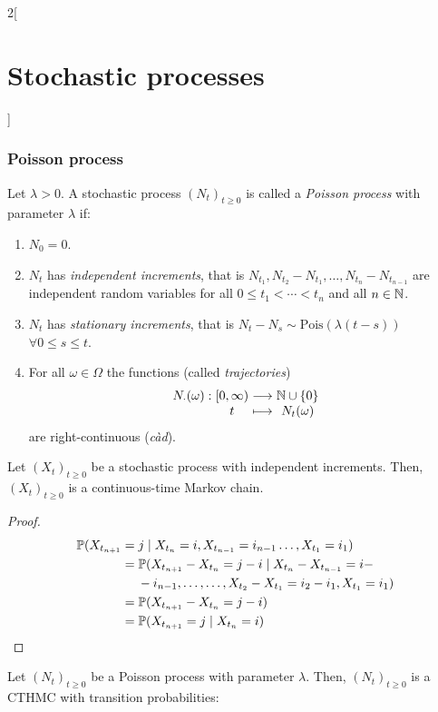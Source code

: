 \documentclass[../../../main_math.tex]{subfiles}
\begin{document}
\begin{multicols}{2}[\section{Stochastic processes}]
  \subsubsection{Poisson process}
  \begin{definition}
    Let $\lambda>0$. A stochastic process ${(N_t)}_{t\geq 0}$ is called a \emph{Poisson process} with parameter $\lambda$ if:
    \begin{enumerate}
      \item $N_0=0$.
      \item $N_t$ has \emph{independent increments}, that is $N_{t_1}, N_{t_2}-N_{t_1},\ldots,N_{t_n}-N_{t_{n-1}}$ are independent random variables for all $0\leq t_1<\cdots<t_n$ and all $n\in\mathbb{N}$.
      \item $N_t$ has \emph{stationary increments}, that is $N_t-N_s\sim\text{Pois}(\lambda(t-s))$ $\forall 0\leq s\leq t$.
      \item For all $\omega\in\Omega$ the functions (called \emph{trajectories})
            $$
              \function{N_\cdot(\omega)}{[0,\infty)}{\NN\cup\{0\}}{t}{N_t(\omega)}
            $$
            are right-continuous (\emph{càd}).
    \end{enumerate}
  \end{definition}
  \begin{proposition}
    Let ${(X_t)}_{t\geq 0}$ be a stochastic process with independent increments. Then, ${(X_t)}_{t\geq 0}$ is a continuous-time Markov chain.
  \end{proposition}
  \begin{proof}
    \begin{align*}
      \mathbb{P}(X_{t_{n+1}} & =  j\mid X_{t_n}=i, X_{t_{n-1}}=i_{n-1}\ldots,X_{t_1}=i_1)                 \\
                        & =\mathbb{P}(X_{t_{n+1}}-X_{t_n}=j-i\mid X_{t_n}-X_{t_{n-1}}=i-                  \\
                        & \hspace{0.45cm}-i_{n-1},\ldots,\ldots,X_{t_2}-X_{t_1}=i_2-i_1,X_{t_1}=i_1) \\
                        & =\mathbb{P}(X_{t_{n+1}}-X_{t_n}=j-i)                                            \\
                        & =\mathbb{P}(X_{t_{n+1}}=j\mid X_{t_n}=i)
    \end{align*}
  \end{proof}
  \begin{corollary}
    Let ${(N_t)}_{t\geq 0}$ be a Poisson process with parameter $\lambda$. Then, ${(N_t)}_{t\geq 0}$ is a CTHMC with transition probabilities:

\end{corollary}
\end{multicols}
\end{document}
